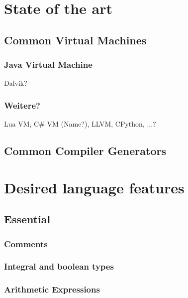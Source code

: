 
\chapter{State of the art}

    \section{Common Virtual Machines}
        
        \subsection{Java Virtual Machine}
            Dalvik?
        
        \subsection{Weitere?}
        
        Lua VM, C\# VM (Name?), LLVM, CPython, ...?
        
    \section{Common Compiler Generators}

\chapter{Desired language features}

    \section{Essential}
    
        \subsection{Comments}
        
        \subsection{Integral and boolean types}
    
        \subsection{Arithmetic Expressions}
        

